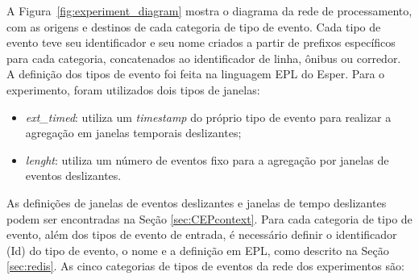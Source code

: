 A Figura~\ref{fig:experiment_diagram} mostra o diagrama da rede de processamento, com as origens e destinos de cada categoria de tipo de evento. %
Cada tipo de evento teve seu identificador
e seu nome criados a partir de prefixos específicos para cada categoria, concatenados ao identificador de linha, ônibus ou corredor.
A definição dos tipos de evento foi feita na linguagem EPL do Esper. 
Para o experimento, foram utilizados dois tipos de janelas:


\begin{itemize}
    \item \textit{ext\_timed}: utiliza um \textit{timestamp} do próprio tipo de evento para realizar a agregação em janelas temporais deslizantes;
    \item \textit{lenght}: utiliza um número de eventos fixo para a agregação por janelas de eventos deslizantes.
\end{itemize}
As definições de janelas de eventos deslizantes e janelas de tempo deslizantes podem ser encontradas na Seção \ref{sec:CEPcontext}. Para cada categoria de tipo de evento, além dos tipos de evento de entrada, é necessário definir o identificador (Id) do tipo de evento, o nome e a definição em EPL, como descrito na Seção \ref{sec:redis}. As cinco categorias de tipos de eventos da rede dos experimentos são: 

